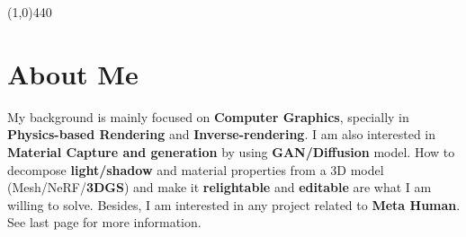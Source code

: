 \documentclass[margin,line]{resume}
\begin{document}
\begin{resume}


    



	\vspace{-5.0mm}
	\line(1,0){440}
	\vspace{-5.0mm}
	
	\section{\mysidestyle About Me}
	
	My background is mainly focused on \textbf{Computer Graphics}, specially in \textbf{Physics-based Rendering} and \textbf{Inverse-rendering}. I am also interested in \textbf{Material Capture and generation} by using \textbf{GAN/Diffusion} model. How to decompose \textbf{light/shadow} and material properties from a 3D model (Mesh/NeRF/\textbf{3DGS}) and make it \textbf{relightable} and \textbf{editable} are what I am willing to solve. Besides, I am interested in any project related to \textbf{Meta Human}. See last page for more information.    


\end{resume}
\end{document}
